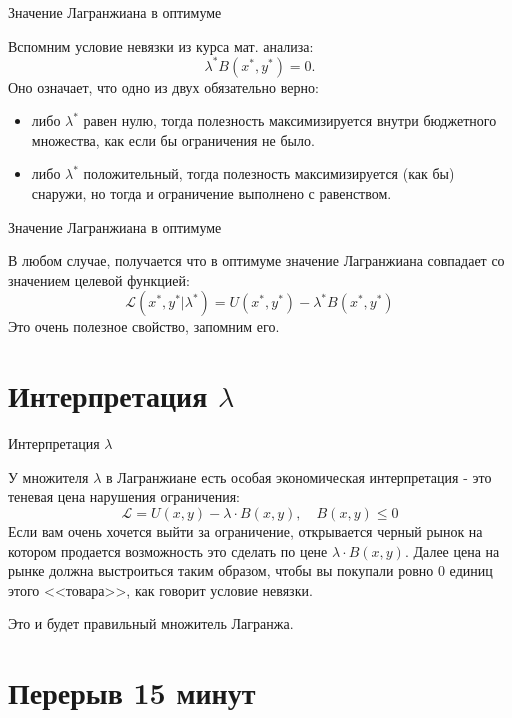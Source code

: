 \documentclass{beamer}
\begin{document}
\begin{frame}{Значение Лагранжиана в оптимуме}

Вспомним условие невязки из курса мат. анализа:
$$ \lambda^{\ast} B(x^{\ast},y^{\ast}) = 0.$$
Оно означает, что одно из двух обязательно верно: 

\begin{itemize}
  \item либо $\lambda^{\ast}$ равен нулю, тогда полезность максимизируется внутри бюджетного множества, как если бы ограничения не было.
  \item либо $\lambda^{\ast}$ положительный, тогда полезность максимизируется (как бы) снаружи,  но тогда и ограничение выполнено с равенством.
\end{itemize}
 

\end{frame}

\begin{frame}{Значение Лагранжиана в оптимуме}

В любом случае, получается что в оптимуме значение Лагранжиана совпадает со значением целевой функцией:
$$ \mathcal{L}(x^{\ast}, y^{\ast} | \lambda^{\ast}) = U(x^{\ast}, y^{\ast}) - \lambda^{\ast} B(x^{\ast}, y^{\ast})$$ 
Это очень полезное свойство, запомним его.

\end{frame}

\section{Интерпретация $\lambda$}

\begin{frame}{Интерпретация $\lambda$}

У множителя $\lambda$ в Лагранжиане есть особая экономическая интерпретация - это \alert{теневая цена} нарушения ограничения:
$$\mathcal{L} = U(x,y) - \lambda \cdot B(x,y), \quad B(x,y) \leqslant 0$$ 
Если вам очень хочется выйти за ограничение, открывается черный рынок на котором продается возможность это сделать по цене $\lambda \cdot B(x,y)$. Далее цена на рынке должна выстроиться таким образом, чтобы вы покупали ровно 0 единиц этого <<товара>>, как говорит условие невязки. 

Это и будет правильный множитель Лагранжа.
\end{frame}

\section{Перерыв 15 минут}
\end{document}
